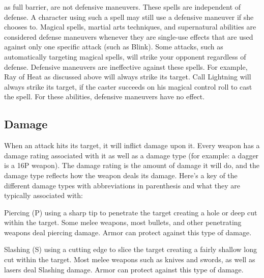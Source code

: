 \documentclass[twoside]{book}
\begin{document}
              as full barrier, are not defensive maneuvers. These
              spells are independent of defense. A character using
              such a spell may still use a defensive maneuver if she
              chooses to.  Magical spells, martial arts techniques,
              and supernatural abilities are considered defense
              maneuvers whenever they are single-use effects that are
              used against only one specific attack (such as
              Blink). Some attacks, such as
              automatically targeting magical spells, will strike your
              opponent regardless of defense. Defensive maneuvers are
              ineffective against these spells. For example, Ray of
              Heat as discussed above will always strike its
              target. Call Lightning will always strike its target, if
              the caster succeeds on his magical control roll to cast
              the spell. For these abilities, defensive maneuvers have
              no effect. 
            
\subsection{Damage}
     When an attack hits its target, it will inflict
               damage upon it. Every weapon has a damage rating
               associated with it as well as a damage type (for example:
               a dagger is a 16P weapon). The damage rating is the
               amount of damage it will do, and the damage type reflects
               how the weapon deals its damage.  Here’s a key of the different damage types
               with abbreviations in parenthesis and what they are
               typically associated with:   
                
                 Piercing (P)   
                    using a sharp tip to penetrate the target
                   creating a hole or deep cut within the target. Some
                   melee weapons, most bullets, and other penetrating
                   weapons deal piercing damage. Armor can protect
                   against this type of damage. 
                
                
                 Slashing (S)   
                    using a cutting edge to slice the target
                   creating a fairly shallow long cut within the target.
                   Most melee weapons such as knives and swords, as well
                   as lasers deal Slashing damage. Armor can protect
                   against this type of damage. 
                
\end{document}
